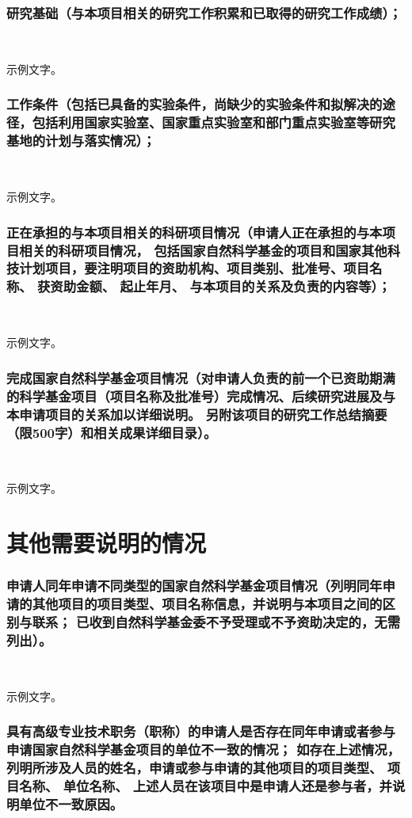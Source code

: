 \documentclass[12pt,a4paper]{article}
\begin{document}
\section{\textbf{研究基础}（与本项目相关的研究工作积累和已取得的研究工作成绩）；}\

示例文字。

\section{\textbf{工作条件}（包括已具备的实验条件，尚缺少的实验条件和拟解决的途径，包括利用国家实验室、国家重点实验室和部门重点实验室等研究基地的计划与落实情况）；}\

示例文字。

\section{\textbf{正在承担的与本项目相关的科研项目情况}（申请人正在承担的与本项目相关的科研项目情况，\hskip -8pt 包括国家自然科学基金的项目和国家其他科技计划项目，要注明项目的资助机构、项目类别、批准号、项目名称、\hskip -5pt 获资助金额、\hskip -5pt 起止年月、\hskip -5pt 与本项目的关系及负责的内容等）；}\

示例文字。

\section{\textbf{完成国家自然科学基金项目情况}（对申请人负责的前一个已资助期满的科学基金项目（项目名称及批准号）完成情况、后续研究进展及与本申请项目的关系加以详细说明。\hskip -8pt 另附该项目的研究工作总结摘要（限500字）和相关成果详细目录）。}\

示例文字。

\part{\textbf{其他需要说明的情况}}
\section{申请人同年申请不同类型的国家自然科学基金项目情况（列明同年申请的其他项目的项目类型、项目名称信息，并说明与本项目之间的区别与联系；\hskip -8pt 已收到自然科学基金委不予受理或不予资助决定的，无需列出）。}\

示例文字。

\section{具有高级专业技术职务（职称）的申请人是否存在同年申请或者参与申请国家自然科学基金项目的单位不一致的情况；\hskip -8pt 如存在上述情况，列明所涉及人员的姓名，申请或参与申请的其他项目的项目类型、\hskip -3pt 项目名称、\hskip -3pt 单位名称、\hskip -3pt 上述人员在该项目中是申请人还是参与者，并说明单位不一致原因。}\
\end{document}
